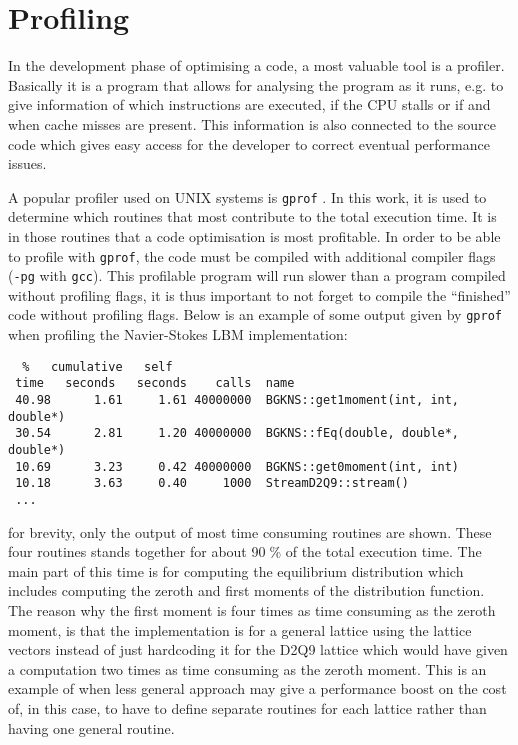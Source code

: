 \section{Profiling}\label{sec:hpc:prof}
In the development phase of optimising a code, a most valuable tool is
a profiler. Basically it is a program that allows for analysing the
program as it runs, e.g. to give information of which instructions are
executed, if the CPU stalls or if and when cache misses are
present. This information is also connected to the source code which
gives easy access for the developer to correct eventual performance
issues.

A popular profiler used on UNIX systems is \texttt{gprof}
\cite{gprof}. In this work, it is used to determine which routines
that most contribute to the total execution time. It is in those
routines that a code optimisation is most profitable. In order to be
able to profile with \texttt{gprof}, the code must be compiled with
additional compiler flags (\texttt{-pg} with \texttt{gcc}). This
profilable program will run slower than a program compiled without
profiling flags, it is thus important to not forget to compile the
``finished'' code without profiling flags. Below is an example of some
output given by \texttt{gprof} when profiling the Navier-Stokes LBM
implementation:

\begin{verbatim}
  %   cumulative   self                         
 time   seconds   seconds    calls  name    
 40.98      1.61     1.61 40000000  BGKNS::get1moment(int, int, double*)
 30.54      2.81     1.20 40000000  BGKNS::fEq(double, double*, double*)
 10.69      3.23     0.42 40000000  BGKNS::get0moment(int, int)
 10.18      3.63     0.40     1000  StreamD2Q9::stream()
 ...
\end{verbatim}
for brevity, only the output of most time consuming routines are
shown. These four routines stands together for about 90$\;$\% of the
total execution time. The main part of this time is for computing the
equilibrium distribution which includes computing the zeroth and first
moments of the distribution function. The reason why the first moment
is four times as time consuming as the zeroth moment, is that the
implementation is for a general lattice using the lattice vectors
instead of just hardcoding it for the D2Q9 lattice which would have
given a computation two times as time consuming as the zeroth moment.
This is an example of when less general approach may give a
performance boost on the cost of, in this case, to have to define
separate routines for each lattice rather than having one general
routine.

